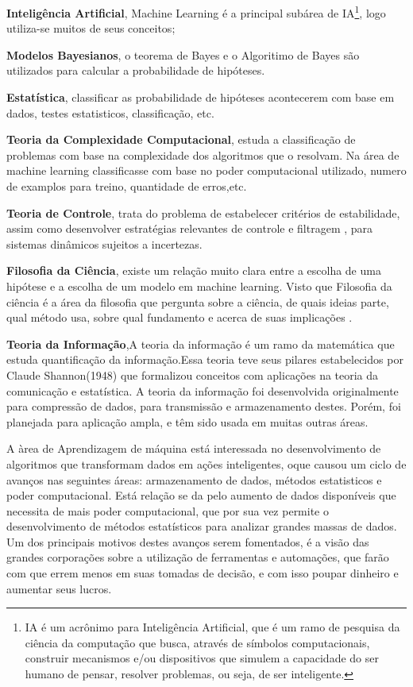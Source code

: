  \begin{alineascomponto}
	\item \textbf{Inteligência Artificial}, Machine Learning é a principal subárea de IA\footnote{IA é um acrônimo para Inteligência Artificial,
	 que é um ramo de pesquisa da ciência da computação que busca, através de símbolos computacionais, construir mecanismos 
	 e/ou dispositivos que simulem a capacidade do ser humano de pensar, resolver problemas, ou seja, de ser inteligente.\cite{IA_Web}},
	 logo utiliza-se muitos de seus conceitos;  
	\item \textbf{Modelos Bayesianos}, o teorema de Bayes e o Algoritimo de Bayes são utilizados para calcular a probabilidade de hipóteses.
	\item \textbf{Estatística}, classificar as probabilidade de hipóteses acontecerem com base em dados, testes estatisticos, classificação, etc.
	\item \textbf{Teoria da Complexidade Computacional}, estuda a classificação de problemas com base na complexidade dos algoritmos que
	o resolvam. Na área de machine learning classificasse com base no poder computacional utilizado, numero de examplos para treino, quantidade de erros,etc.   
	\item \textbf{Teoria de Controle}, trata do problema de estabelecer critérios de estabilidade, assim como desenvolver estratégias 
	relevantes de controle e filtragem , para sistemas dinâmicos sujeitos a incertezas.
	\item \textbf{Filosofia da Ciência}, existe um relação muito clara entre a escolha de uma hipótese e a escolha de um modelo em machine learning. Visto que Filosofia da ciência é a área da filosofia que pergunta sobre a ciência, de quais ideias parte, qual método usa, sobre qual fundamento e acerca de suas implicações \cite{FilosofiaCiencia}.
	\item \textbf{Teoria da Informação},A teoria da informação é um ramo da matemática que estuda quantificação da informação.Essa teoria teve seus 
	pilares estabelecidos por Claude Shannon(1948) que formalizou conceitos com aplicações na teoria da comunicação e estatística. 
	A teoria da informação foi desenvolvida originalmente para compressão de dados, para transmissão e armazenamento destes. 
	Porém, foi planejada para aplicação ampla, e têm sido usada em muitas outras áreas.\cite{TeoriaInformacao}	
\end{alineascomponto}

A àrea de Aprendizagem de máquina está interessada no desenvolvimento de algoritmos que transformam dados em ações inteligentes, oque causou
um ciclo de avanços nas seguintes áreas: armazenamento de dados, métodos estatisticos e poder computacional. Está relação se da pelo aumento de dados disponíveis que necessita de 
mais poder computacional, que por sua vez permite o desenvolvimento de métodos estatísticos para analizar grandes massas de dados. Um dos principais motivos destes avanços serem fomentados, 
é a visão das grandes corporações sobre a utilização de ferramentas e automações, que farão com que errem menos em suas tomadas de decisão, e com isso poupar dinheiro e aumentar seus lucros.

